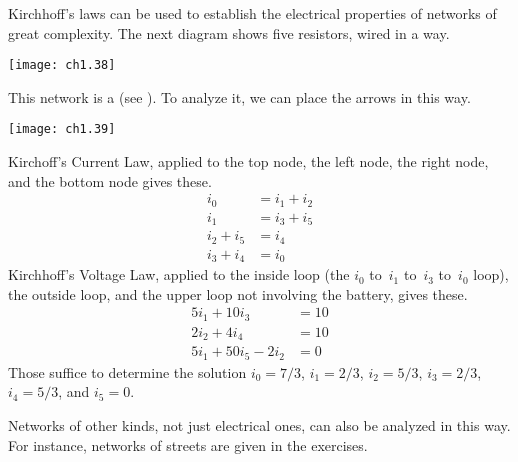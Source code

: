 Kirchhoff's laws can be used to
establish the electrical properties of networks of great complexity.
The next diagram shows
five resistors, wired in 
a  
way.
\begin{center}
  \texttt{[image: ch1.38]}
\end{center}
This network is a  
(see ).
To analyze it, we can place the arrows in this way.
\begin{center}
  \texttt{[image: ch1.39]}
\end{center}
Kirchoff's Current Law, applied to the
top node, the left node, the right node, and the bottom node gives
these.
\begin{align*}
   i_0     &=  i_1+i_2  \\
   i_1     &=  i_3+i_5  \\
   i_2+i_5 &=  i_4      \\
   i_3+i_4 &=  i_0
\end{align*} 
Kirchhoff's Voltage Law,
applied to the inside loop (the $i_0$ to~$i_1$ to~$i_3$ to~$i_0$ loop), 
the outside loop, 
and the upper loop not involving the battery, gives these.  
\begin{align*}
      5i_1+10i_3  &= 10   \\
      2i_2+4i_4   &= 10   \\
      5i_1+50i_5-2i_2  &= 0     
\end{align*} 
Those suffice to determine the solution 
$i_0=7/3$, $i_1=2/3$, $i_2=5/3$, 
$i_3=2/3$, $i_4=5/3$, and $i_5=0$. 

Networks of other kinds, not just electrical ones, can also be
analyzed in this way.
For instance, networks of streets are given in the exercises.
 
